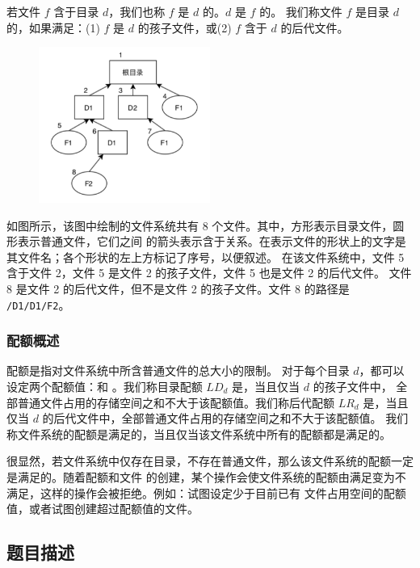 若文件 $f$ 含于目录 $d$，我们也称 $f$ 是 $d$ 的{}。$d$ 是 $f$ 的{}。
我们称文件 $f$ 是目录 $d$ 的{}，如果满足：(1) $f$ 是 $d$ 的孩子文件，或(2)
$f$ 含于 $d$ 的后代文件。

\begin{figure}[H]
    \centering
    \includegraphics[width=0.5\textwidth]{image/21/3-p-1.png}
\end{figure}

如图所示，该图中绘制的文件系统共有 8 个文件。其中，方形表示目录文件，圆形表示普通文件，它们之间
的箭头表示含于关系。在表示文件的形状上的文字是其文件名；各个形状的左上方标记了序号，以便叙述。
在该文件系统中，文件 5 含于文件 2，文件 5 是文件 2 的孩子文件，文件 5 也是文件 2 的后代文件。
文件 8 是文件 2 的后代文件，但不是文件 2 的孩子文件。文件 8 的路径是 \verb|/D1/D1/F2|。

\subsubsection*{配额概述}
配额是指对文件系统中所含普通文件的总大小的限制。
对于每个目录 $d$，都可以设定两个配额值：{}和
{}。我们称目录配额 $LD_{d}$ 是{}，当且仅当 $d$ 的孩子文件中，
全部普通文件占用的存储空间之和不大于该配额值。我们称后代配额 $LR_{d}$
是{}，当且仅当 $d$ 的后代文件中，全部普通文件占用的存储空间之和不大于该配额值。
我们称文件系统的配额是满足的，当且仅当该文件系统中所有的配额都是满足的。

很显然，若文件系统中仅存在目录，不存在普通文件，那么该文件系统的配额一定是满足的。随着配额和文件
的创建，某个操作会使文件系统的配额由满足变为不满足，这样的操作会被拒绝。例如：试图设定少于目前已有
文件占用空间的配额值，或者试图创建超过配额值的文件。

\subsection*{题目描述}

